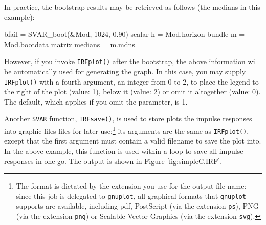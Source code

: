 \documentclass[a4paper,10pt]{article}
\begin{document}
In practice, the bootstrap results may be retrieved as follows (the
medians in this example):
\begin{code}
  bfail = SVAR_boot(&Mod, 1024, 0.90)
  scalar h = Mod.horizon
  bundle m = Mod.bootdata
  matrix medians = m.mdns
\end{code}

However, if you invoke \texttt{IRFplot()} after the bootstrap, the
above information will be automatically used for generating the
graph. In this case, you may supply \texttt{IRFplot()} with a fourth
argument, an integer from 0 to 2, to place the legend to the right of
the plot (value: 1), below it (value: 2) or omit it altogether (value:
0). The default, which applies if you omit the parameter, is 1.

Another \texttt{SVAR} function, \texttt{IRFsave()}, is used to
store plots the impulse responses into graphic files files for later
use;\footnote{The format is dictated by the extension you use for the
  output file name: since this job is delegated to \texttt{gnuplot},
  all graphical formats that \texttt{gnuplot} supports are available,
  including pdf, PostScript (via the extension \texttt{ps}), PNG (via
  the extension \texttt{png}) or Scalable Vector Graphics (via the
  extension \texttt{svg}). } its arguments are the same as
\texttt{IRFplot()}, except that the first argument must contain a
valid filename to save the plot into. In the above example, this
function is used within a loop to save all impulse responses in one
go. The output is shown in Figure \ref{fig:simpleC.IRF}.
\end{document}
